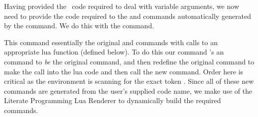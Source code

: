 \startConTest
\begingroup
\endgroup
\stopConTest

\startConTest
\begingroup
  \firstargumentfalse
  \secondargumentfalse
  \thirdargumentfalse
\endgroup
\stopConTest

\startConTest
\begingroup
\endgroup
\stopConTest

\stopTestCase


\startConTest
\begingroup
\endgroup
\stopConTest
\stopTestCase

\stopTestSuite


Having provided the \ConTeXt\ code required to deal with variable
arguments, we now need to provide the code required to  the
\type{\startXXX} and \type{\stopXXX} commands automatically generated by
the  command. We do this with the \type{\fixLitProgs}
command.

This command essentially  the original \type{\startXXX} and
\type{\stopXXX} commands with calls to an appropriate lua function
(defined below). To do this our  command \type{\let}'s an
\type{\oldXXX} command to \emph{be} the original command, and then
redefine the original command to make the call into the lua code and then
call the new \type{\oldXXX} command. Order here is critical as the
 environment is scanning for the exact token \type{\stopXXX}.
Since all of these new commands are generated from the user's supplied
code name, we make use of the Literate Programming Lua Renderer to
dynamically build the required commands.

